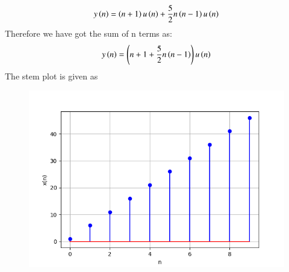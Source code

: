 \documentclass[journal,12pt,twocolumn]{IEEEtran}
\theoremstyle{remark}
\begin{document}
\begin{align}
y\left(n\right) = \left(n+1 \right)u\left(n\right) + \frac{5}{2} n\left(n-1\right) u\left(n\right)
\end{align}
Therefore we have got the sum of n terms as:
\begin{align}
y\left(n\right)= \left(n+1 + \frac{5}{2} n\left(n-1\right)\right)u\left(n\right)
\end{align}
The stem plot is given as
\begin{figure}[h!]
  \centering
  \includegraphics[width=\columnwidth]{figs/stem.png}
  \label{fig:Stem_Plot}
\end{figure}
\end{document}
